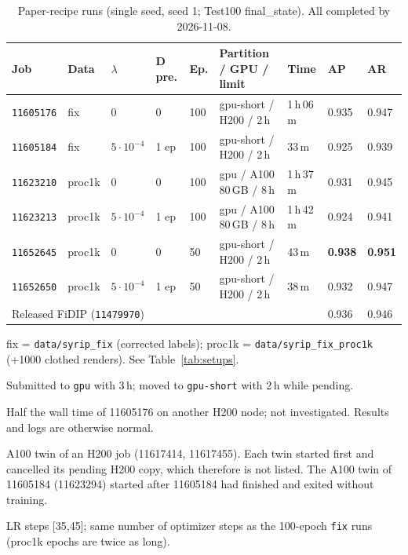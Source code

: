 \documentclass[10pt]{article}
\newcommand{\job}[1]{\texttt{#1}}
\begin{document}
\begin{table}[h]\centering\small
\begin{threeparttable}
\caption{Paper-recipe runs (single seed, seed 1; Test100 final\_state). All completed by 2026-11-08.}
\label{tab:paper}
\begin{tabularx}{\linewidth}{l l l l l X l l l}
\toprule
Job & Data\tnote{a} & $\lambda$ & D pre. & Ep. & Partition / GPU / limit & Time & AP & AR \\
\midrule
\job{11605176} & fix & 0 & 0 & 100 & gpu-short / H200 / 2\,h\tnote{b} & 1\,h\,06\,m & 0.935 & 0.947 \\
\job{11605184} & fix & $5\cdot10^{-4}$ & 1 ep & 100 & gpu-short / H200 / 2\,h\tnote{b} & 33\,m\tnote{c} & 0.925 & 0.939 \\
\midrule
\job{11623210}\tnote{d} & proc1k & 0 & 0 & 100 & gpu / A100 80\,GB / 8\,h & 1\,h\,37\,m & 0.931 & 0.945 \\
\job{11623213}\tnote{d} & proc1k & $5\cdot10^{-4}$ & 1 ep & 100 & gpu / A100 80\,GB / 8\,h & 1\,h\,42\,m & 0.924 & 0.941 \\
\midrule
\job{11652645} & proc1k & 0 & 0 & 50\tnote{e} & gpu-short / H200 / 2\,h & 43\,m & \textbf{0.938} & \textbf{0.951} \\
\job{11652650} & proc1k & $5\cdot10^{-4}$ & 1 ep & 50\tnote{e} & gpu-short / H200 / 2\,h & 38\,m & 0.932 & 0.947 \\
\midrule
\multicolumn{7}{l}{Released FiDIP (\job{11479970})} & 0.936 & 0.946 \\
\bottomrule
\end{tabularx}
\begin{tablenotes}\footnotesize
\item[a] fix = \texttt{data/syrip\_fix} (corrected labels); proc1k = \texttt{data/syrip\_fix\_proc1k} (+1000 clothed renders). See Table~\ref{tab:setups}.
\item[b] Submitted to \texttt{gpu} with 3\,h; moved to \texttt{gpu-short} with 2\,h while pending.
\item[c] Half the wall time of 11605176 on another H200 node; not investigated. Results and logs are otherwise normal.
\item[d] A100 twin of an H200 job (11617414, 11617455). Each twin started first and cancelled its pending H200 copy, which therefore is not listed. The A100 twin of 11605184 (11623294) started after 11605184 had finished and exited without training.
\item[e] LR steps [35,45]; same number of optimizer steps as the 100-epoch \texttt{fix} runs (proc1k epochs are twice as long).
\end{tablenotes}
\end{threeparttable}
\end{table}
\end{document}
